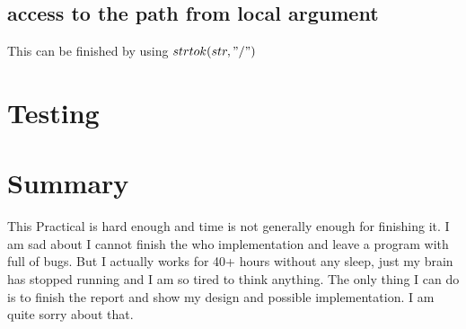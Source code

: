 \documentclass[legalpaper]{article}
\begin{document}
	\subsection*{access to the path from local argument}
	This can be finished by using $strtok(str, "/")$
	\section{Testing}
	
	\section{Summary}
	This Practical is hard enough and time is not generally enough for finishing it. I am sad about I cannot finish the who implementation and leave a program with full of bugs. But I actually works for 40+ hours without any sleep, just my brain has stopped running and I am so tired to think anything. The only thing I can do is to finish the report and show my design and possible implementation. I am quite sorry about that.
\end{document}
